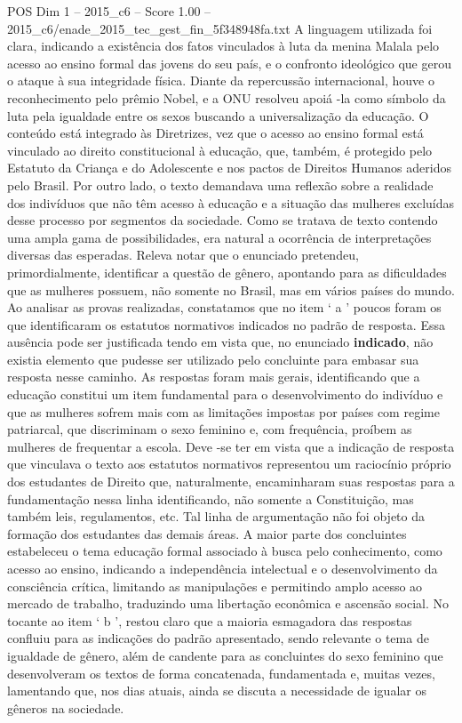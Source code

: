 \begin{textsample}{POS Dim 1 – 2015\_c6 – Score 1.00 – 2015\_c6/enade\_2015\_tec\_gest\_fin\_5f348948fa.txt}
A linguagem utilizada foi clara, indicando a existência dos fatos vinculados à luta da menina Malala pelo acesso ao ensino formal das jovens do seu país, e o confronto ideológico que gerou o ataque à sua integridade física.
Diante da repercussão internacional, houve o reconhecimento pelo prêmio Nobel, e a ONU resolveu apoiá -la como símbolo da luta pela igualdade entre os sexos buscando a universalização da educação.
O conteúdo está integrado às Diretrizes, vez que o acesso ao ensino formal está vinculado ao direito constitucional à educação, que, também, é protegido pelo Estatuto da Criança e do Adolescente e nos pactos de Direitos Humanos aderidos pelo Brasil.
Por outro lado, o texto demandava uma reflexão sobre a realidade dos indivíduos que não têm acesso à educação e a situação das mulheres excluídas desse processo por segmentos da sociedade.
Como se tratava de texto contendo uma ampla gama de possibilidades, era natural a ocorrência de interpretações diversas das esperadas.
Releva notar que o enunciado pretendeu, primordialmente, identificar a questão de gênero, apontando para as dificuldades que as mulheres possuem, não somente no Brasil, mas em vários países do mundo.
Ao analisar as provas realizadas, constatamos que no item ‘ a ’ poucos foram os que identificaram os estatutos normativos indicados no padrão de resposta.
Essa ausência pode ser justificada tendo em vista que, no enunciado \textbf{indicado}, não existia elemento que pudesse ser utilizado pelo concluinte para embasar sua resposta nesse caminho.
As respostas foram mais gerais, identificando que a educação constitui um item fundamental para o desenvolvimento do indivíduo e que as mulheres sofrem mais com as limitações impostas por países com regime patriarcal, que discriminam o sexo feminino e, com frequência, proíbem as mulheres de frequentar a escola.
Deve -se ter em vista que a indicação de resposta que vinculava o texto aos estatutos normativos representou um raciocínio próprio dos estudantes de Direito que, naturalmente, encaminharam suas respostas para a fundamentação nessa linha identificando, não somente a Constituição, mas também leis, regulamentos, etc.
Tal linha de argumentação não foi objeto da formação dos estudantes das demais áreas.
A maior parte dos concluintes estabeleceu o tema educação formal associado à busca pelo conhecimento, como acesso ao ensino, indicando a independência intelectual e o desenvolvimento da consciência crítica, limitando as manipulações e permitindo amplo acesso ao mercado de trabalho, traduzindo uma libertação econômica e ascensão social.
No tocante ao item ‘ b ’, restou claro que a maioria esmagadora das respostas confluiu para as indicações do padrão apresentado, sendo relevante o tema de igualdade de gênero, além de candente para as concluintes do sexo feminino que desenvolveram os textos de forma concatenada, fundamentada e, muitas vezes, lamentando que, nos dias atuais, ainda se discuta a necessidade de igualar os gêneros na sociedade.

\end{textsample}
